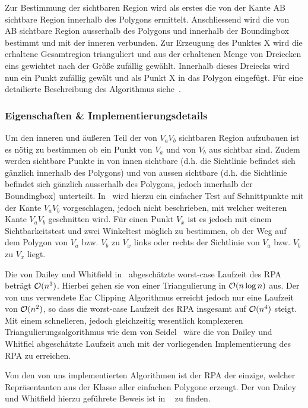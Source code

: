     Zur Bestimmung der sichtbaren Region wird als erstes die von der Kante AB
    sichtbare Region innerhalb des Polygons ermittelt. Anschliessend wird die
    von AB sichtbare Region ausserhalb des Polygons und innerhalb der
    Boundingbox bestimmt und mit der inneren verbunden. Zur Erzeugung des
    Punktes X wird die erhaltene Gesamtregion trianguliert und aus der
    erhaltenen Menge von Dreiecken eins gewichtet nach der Größe zufällig
    gewählt. Innerhalb dieses Dreiecks wird nun ein Punkt zufällig gewält und
    als Punkt X in das Polygon eingefügt. Für eine detailierte Beschreibung
    des Algorithmus siehe~\cite{dailey08rpa}.
  

  \subsubsection{Eigenschaften \& Implementierungsdetails} %
  \label{ssub:eigenschaften}

    Um den inneren und äußeren Teil der von $V_aV_b$ sichtbaren Region
    aufzubauen ist es nötig zu bestimmen ob ein Punkt von $V_a$ und von $V_b$
    aus sichtbar sind. Zudem werden sichtbare Punkte in von innen sichtbare
    (d.h. die Sichtlinie befindet sich gänzlich innerhalb des Polygons) und
    von aussen sichtbare (d.h. die Sichtlinie befindet sich gänzlich
    ausserhalb des Polygons, jedoch innerhalb der Boundingbox) unterteilt.
    In~\cite{dailey08rpa} wird hierzu ein einfacher Test auf Schnittpunkte mit
    der Kante $V_aV_b$ vorgeschlagen, jedoch nicht beschrieben, mit welcher
    weiteren Kante $V_aV_b$ geschnitten wird. Für einen Punkt $V_x$ ist es
    jedoch mit einem Sichtbarkeitstest und zwei Winkeltest möglich zu
    bestimmen, ob der Weg auf dem Polygon von $V_a$ bzw. $V_b$ zu $V_x$ links
    oder rechts der Sichtlinie von $V_a$ bzw. $V_b$ zu $V_x$ liegt.

    Die von Dailey und Whitfield in~\cite{dailey08rpa} abgeschätzte worst-case
    Laufzeit des RPA beträgt $\mathcal{O}(n^3)$. Hierbei gehen sie von einer
    Triangulierung in $\mathcal{O}(n \log n)$ aus. Der von uns verwendete Ear
    Clipping Algorithmus erreicht jedoch nur eine Laufzeit von $\mathcal{O}(n^2)$,
    so dass die worst-case Laufzeit des RPA insgesamt auf $\mathcal{O}(n^4)$ steigt.
    Mit einem schnelleren, jedoch gleichzeitig wesentlich komplexeren
    Triangulierungsalgorithmus wie dem von Seidel~\cite{seidel91asimple} wäre
    die von Dailey und Whitfiel abgeschätzte Laufzeit auch mit der
    vorliegenden Implementierung des RPA zu erreichen.

    Von den von uns implementierten Algorithmen ist der RPA der einzige,
    welcher Repräsentanten aus der Klasse aller einfachen Polygone erzeugt.
    Der von Dailey und Whitfield hierzu geführete Beweis ist in
    ~\cite{dailey08rpa} zu finden.


